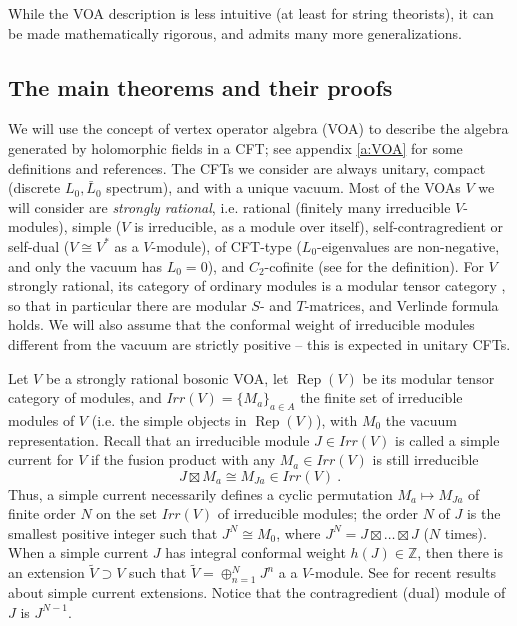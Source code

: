 \documentclass[11pt,reqno]{article}
\newcommand{\be}{\begin{equation}}
\newcommand{\ee}{\end{equation}}
\newcommand{\ZZ}{\mathbb{Z}}
\DeclareMathOperator{\Rep}{Rep}
\begin{document}
While the VOA description is less intuitive (at least for string theorists), it can be made mathematically rigorous, and admits many more generalizations. 





\subsection{The main theorems and their proofs}\label{s:proofs}

We will use the concept of vertex operator algebra (VOA) to describe the algebra generated by holomorphic fields in a CFT; see appendix \ref{a:VOA} for some definitions and references. The CFTs we consider are always unitary, compact (discrete $L_0,\bar L_0$ spectrum), and with a unique vacuum. Most of the VOAs $V$ we will consider are \emph{strongly rational}, i.e. rational (finitely many irreducible $V$-modules), simple ($V$ is irreducible, as a module over itself), self-contragredient or self-dual ($V\cong V^*$ as a $V$-module), of CFT-type ($L_0$-eigenvalues are non-negative, and only the vacuum has $L_0=0$), and $C_2$-cofinite (see \cite{Zhu1996ModularInvariance} for the definition).  For $V$ strongly rational, its category of ordinary modules is a modular tensor category \cite{Huang2008Rigidity}, so that in particular there are modular $S$- and $T$-matrices,  and Verlinde formula holds. We will also assume that the conformal weight of irreducible modules different from the vacuum are strictly positive -- this is expected in unitary CFTs.

Let $V$ be a strongly rational bosonic VOA, let $\Rep(V)$ be its modular tensor category of modules, and $Irr(V)=\{M_a\}_{a\in A}$ the finite set of irreducible modules of $V$ (i.e. the simple objects in $\Rep(V)$), with $M_0$ the vacuum representation. Recall that an irreducible module $J\in Irr(V)$ is called a simple current for $V$ if the fusion product with any $M_a\in Irr(V)$ is still irreducible
\be J\boxtimes M_a\cong M_{Ja}\in Irr(V)\ .
\ee Thus, a simple current necessarily defines a cyclic permutation $M_a\mapsto M_{Ja}$ of finite order $N$ on the set $Irr(V)$ of irreducible modules; the order $N$ of $J$ is the smallest positive integer such that $J^N\cong M_0$, where $J^N=J\boxtimes \ldots \boxtimes J$ ($N$ times).  When a simple current $J$ has integral conformal weight $h(J)\in \ZZ$, then there is an extension $\tilde V\supset V$ such that $\tilde V=\oplus_{n=1}^N J^n$ a a $V$-module.
See \cite{Carnahan:2014emx,Creutzig:2015buk} for recent results about simple current extensions. Notice that the contragredient (dual) module of $J$ is $J^{N-1}$.
\end{document}
